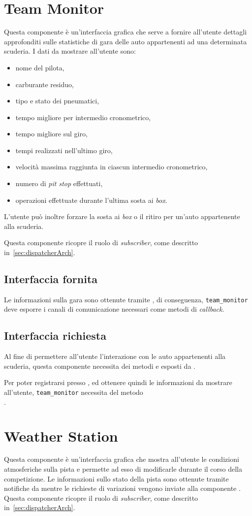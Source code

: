\section{Team Monitor}
Questa componente è un'interfaccia grafica che serve a fornire all'utente dettagli approfonditi sulle statistiche di gara delle auto appartenenti ad una determinata scuderia.
I dati da mostrare all'utente sono:
\begin{itemize}
\item nome del pilota,
\item carburante residuo,
\item tipo e stato dei pneumatici,
\item tempo migliore per intermedio cronometrico,
\item tempo migliore sul giro,
\item tempi realizzati nell'ultimo giro,
\item velocità massima raggiunta in ciascun intermedio cronometrico,
\item numero di \textit{pit stop} effettuati,
\item operazioni effettuate durante l'ultima sosta ai \textit{box}.
\end{itemize}
L'utente può inoltre forzare la sosta ai \textit{box} o il ritiro per un'auto appartenente alla scuderia.

Questa componente ricopre il ruolo di \textit{subscriber}, come descritto in~\ref{sec:dispatcherArch}.

\subsection*{Interfaccia fornita}
Le informazioni sulla gara sono ottenute tramite \evdisp{}, di conseguenza, \texttt{team\_monitor} deve esporre i canali di comunicazione necessari come metodi di \textit{callback}.
\subsection*{Interfaccia richiesta}
Al fine di permettere all'utente l'interazione con le auto appartenenti alla scuderia, questa componente necessita dei metodi  e  esposti da \car{}.

Per poter registrarsi presso \evdisp{}, ed ottenere quindi le informazioni da mostrare all'utente, \texttt{team\_monitor} necessita del metodo \\.

\section{Weather Station}
Questa componente è un'interfaccia grafica che mostra all'utente le condizioni atmosferiche sulla pista e permette ad esso di modificarle durante il corso della competizione. Le informazioni sullo stato della pista sono ottenute tramite notifiche da \evdisp{} mentre le richieste di variazioni vengono inviate alla componente \weather{}.
Questa componente ricopre il ruolo di \textit{subscriber}, come descritto in~\ref{sec:dispatcherArch}.

